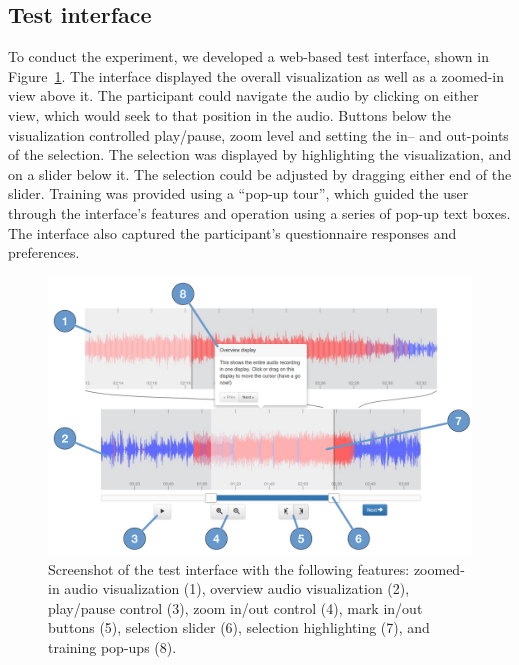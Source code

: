\subsection{Test interface}
To conduct the experiment, we developed a web-based test interface, shown in Figure~\ref{fig:visualization-interface}.
The interface displayed the overall visualization as well as a zoomed-in view above it. The participant could navigate
the audio by clicking on either view, which would seek to that position in the audio.  Buttons below the visualization
controlled play/pause, zoom level and setting the in-- and out-points of the selection.  The selection was displayed by
highlighting the visualization, and on a slider below it. The selection could be adjusted by dragging either end of the
slider.  Training was provided using a ``pop-up tour'', which guided the user through the interface's features and
operation using a series of pop-up text boxes.  The interface also captured the participant's questionnaire responses
and preferences.

\begin{figure}[ht]
\centering
\includegraphics[width=\columnwidth]{figs/browser-audio-interface.pdf}
\caption{Screenshot of the test interface with the following features:
zoomed-in audio visualization (1),
overview audio visualization (2),
play/pause control (3),
zoom in/out control (4),
mark in/out buttons (5),
selection slider (6),
selection highlighting (7),
and training pop-ups (8).}
\label{fig:visualization-interface}
\end{figure}


